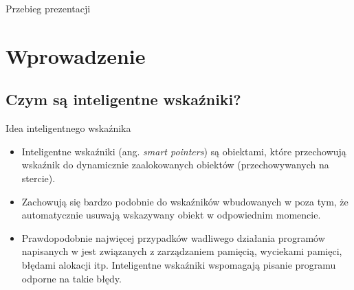 
\usepackage{relsize}
\usepackage{lipsum}
\usepackage{alltt}

\def\ifmonospace{\ifdim\fontdimen3\font=0pt }

\def\C++{%
  \ifmonospace%
  C++%
  \else%
  C\kern-.1667em\raise.30ex\hbox{\smaller{++}}%
  \fi%
  \spacefactor1000 }

\def\Csharp{%
  \ifmonospace%
  C\#%
  \else%
  C\kern-.1667em\raise.30ex\hbox{\smaller{\#}}%
  \fi%
  \spacefactor1000 }



\frame{\titlepage}

\begin{frame}{Przebieg prezentacji}
  \tableofcontents
\end{frame}



\section{Wprowadzenie}

\subsection{Czym są inteligentne wskaźniki?}

\begin{frame}[t]{Idea inteligentnego wskaźnika}
  \begin{itemize}
  \item Inteligentne wskaźniki (ang. \emph{smart pointers}) są obiektami,
    które przechowują wskaźnik do dynamicznie zaalokowanych obiektów
    (przechowywanych na stercie). \pause
  \item Zachowują się bardzo podobnie do
    wskaźników wbudowanych w \C++ poza tym, że automatycznie usuwają wskazywany
    obiekt w odpowiednim momencie. \pause
  \item Prawdopodobnie najwięcej przypadków wadliwego działania
    programów napisanych w \C++ jest związanych z zarządzaniem
    pamięcią, wyciekami pamięci, błędami alokacji itp.
    Inteligentne wskaźniki wspomagają pisanie 
    programu odporne na takie błędy.
  \end{itemize}
\end{frame}





